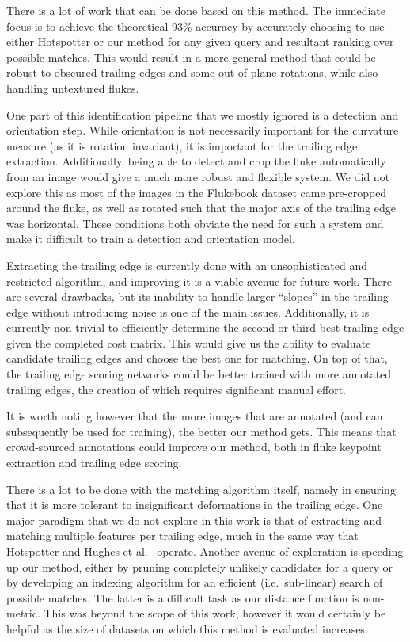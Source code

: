 There is a lot of work that can be done based on this method.
The immediate focus is to achieve the theoretical 93\% accuracy by accurately choosing to use either Hotspotter or our method for any given query and resultant ranking over possible matches.
This would result in a more general method that could be robust to obscured trailing edges and some out-of-plane rotations, while also handling untextured flukes.

One part of this identification pipeline that we mostly ignored is a detection and orientation step.
While orientation is not necessarily important for the curvature measure (as it is rotation invariant), it is important for the trailing edge extraction.
Additionally, being able to detect and crop the fluke automatically from an image would give a much more robust and flexible system.
We did not explore this as most of the images in the Flukebook dataset came pre-cropped around the fluke, as well as rotated such that the major axis of the trailing edge was horizontal.
These conditions both obviate the need for such a system and make it difficult to train a detection and orientation model.

Extracting the trailing edge is currently done with an unsophisticated and restricted algorithm, and improving it is a viable avenue for future work. 
There are several drawbacks, but its inability to handle larger ``slopes'' in the trailing edge without introducing noise is one of the main issues.
Additionally, it is currently non-trivial to efficiently determine the second or third best trailing edge given the completed cost matrix.
This would give us the ability to evaluate candidate trailing edges and choose the best one for matching.
On top of that, the trailing edge scoring networks could be better trained with more annotated trailing edges, the creation of which requires significant manual effort.

It is worth noting however that the more images that are annotated (and can subsequently be used for training), the better our method gets.
This means that crowd-sourced annotations could improve our method, both in fluke keypoint extraction and trailing edge scoring.

There is a lot to be done with the matching algorithm itself, namely in ensuring that it is more tolerant to insignificant deformations in the trailing edge.
One major paradigm that we do not explore in this work is that of extracting and matching multiple features per trailing edge, much in the same way that Hotspotter and Hughes et al.\ \cite{hughes2015automated} operate.
Another avenue of exploration is speeding up our method, either by pruning completely unlikely candidates for a query or by developing an indexing algorithm for an efficient (i.e.\ sub-linear) search of possible matches.
The latter is a difficult task as our distance function is non-metric.
This was beyond the scope of this work, however it would certainly be helpful as the size of datasets on which this method is evaluated increases.


